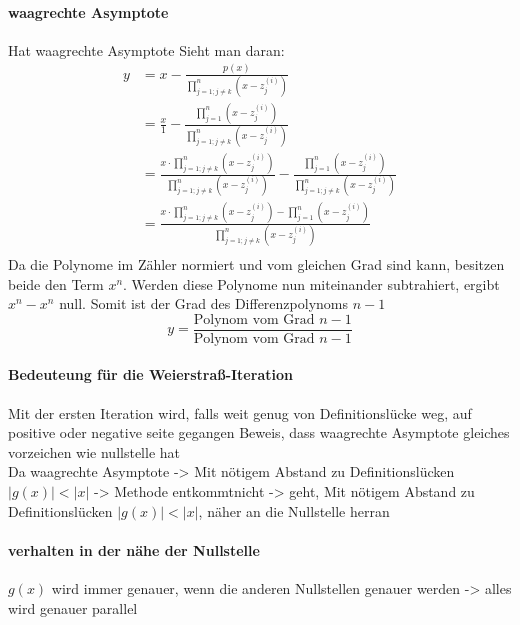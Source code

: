 \documentclass{article}
\begin{document}
\paragraph{waagrechte Asymptote}
Hat waagrechte Asymptote
Sieht man daran:
\begin{align*}
    y &= x - \frac{p(x)}{\prod_{j=1;j\neq k}^{n} (x-z_j^{(i)})} \\
    &= \frac{x}{1} - \frac{\prod_{j=1}^{n} (x-z_j^{(i)})}{\prod_{j=1;j\neq k}^{n} (x-z_j^{(i)})} \\
    &= \frac{x \cdot \prod_{j=1;j\neq k}^{n} (x-z_j^{(i)})}{\prod_{j=1;j\neq k}^{n} (x-z_j^{(i)})} - \frac{\prod_{j=1}^{n} (x-z_j^{(i)})}{\prod_{j=1;j\neq k}^{n} (x-z_j^{(i)})} \\
    &= \frac{x \cdot \prod_{j=1;j\neq k}^{n} (x-z_j^{(i)}) - \prod_{j=1}^{n} (x-z_j^{(i)})}{\prod_{j=1;j\neq k}^{n} (x-z_j^{(i)})} \\
\end{align*}
Da die Polynome im Zähler normiert und vom gleichen Grad sind kann, besitzen beide den Term $x^n$. Werden diese Polynome nun miteinander subtrahiert, ergibt $x^n-x^n$ null. Somit ist der Grad des Differenzpolynoms $n-1$ \\
\begin{equation*}
    y = \frac{\text{Polynom vom Grad }n-1}{\text{Polynom vom Grad }n-1}
\end{equation*}
\paragraph{Bedeuteung für die Weierstraß-Iteration}
Mit der ersten Iteration wird, falls weit genug von Definitionslücke weg, auf positive oder negative seite gegangen
    Beweis, dass waagrechte Asymptote gleiches vorzeichen wie nullstelle hat
\\
Da waagrechte Asymptote -> Mit nötigem Abstand zu Definitionslücken $|g(x)|<|x|$
-> Methode \glqq entkommt\grqq\space nicht
-> geht, Mit nötigem Abstand zu Definitionslücken $|g(x)|<|x|$, näher an die Nullstelle herran
\paragraph{verhalten in der nähe der Nullstelle}
$g(x)$ wird immer genauer, wenn die anderen Nullstellen genauer werden
-> alles wird genauer parallel
\end{document}
